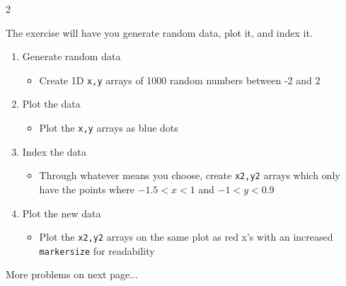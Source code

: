 \documentclass[12pt]{article}%
\newcommand{\code}[1]{\texttt{#1}}
\begin{document}
\begin{multicols*}{2}
\begin{Exercise}[origin={20 points, Python}]
\end{Exercise}


\begin{Exercise}[origin={20 points, Python}]

The exercise will have you generate random data, plot it, and index it.

\begin{enumerate}[leftmargin=*]
	\item Generate random data
	\begin{itemize}[leftmargin=*]
		\item Create 1D \code{x,y} arrays of 1000 random numbers between -2 and 2
	\end{itemize}
	\item Plot the data
	\begin{itemize}[leftmargin=*]
		\item Plot the \code{x,y} arrays as blue dots
	\end{itemize}
	\item Index the data
	\begin{itemize}[leftmargin=*]
		\item Through whatever means you choose, create \code{x2,y2} arrays which only have the points where $-1.5<x<1$ and $-1<y<0.9$
	\end{itemize}
	\item Plot the new data
	\begin{itemize}[leftmargin=*]
		\item Plot the \code{x2,y2} arrays on the same plot as red x's with an increased \code{markersize} for readability
	\end{itemize}
\end{enumerate}

\end{Exercise}

More problems on next page...

\vfill\null
\pagebreak

\begin{Exercise}[origin={20 points, Python}]


\end{Exercise}
\end{multicols*}
\end{document}
